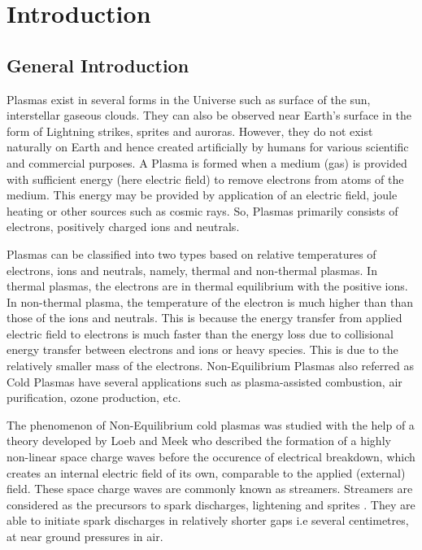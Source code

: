 \chapter{Introduction}
\section{General Introduction}
Plasmas exist in several forms in the Universe such as surface of the sun, interstellar gaseous clouds. They can also be observed near Earth's surface in the form of Lightning strikes, sprites and auroras. However, they do not exist naturally on Earth and hence created artificially by humans for various scientific and commercial purposes. A Plasma is formed when a medium (gas) is provided with sufficient energy (here electric field) to remove electrons from atoms of the medium. This energy may be provided by application of an electric field, joule heating or other sources such as cosmic rays. So, Plasmas primarily consists of electrons, positively charged ions and neutrals.

Plasmas can be classified into two types based on relative temperatures of electrons, ions and neutrals, namely, thermal and non-thermal plasmas. In thermal plasmas, the electrons are in thermal equilibrium with the positive ions. In non-thermal plasma, the temperature of the electron is much higher than than those of the ions and neutrals. This is because the energy transfer from applied electric field to electrons is much faster than the energy loss due to collisional energy transfer between electrons and ions or heavy species. This is due to the relatively smaller mass of the electrons. Non-Equilibrium Plasmas also referred as Cold Plasmas have several applications such as plasma-assisted combustion, air purification, ozone production, etc.

The phenomenon of Non-Equilibrium cold plasmas was studied with the help of a theory developed by Loeb and Meek \cite{Loeb and Meek , 1940a and 1940b} who described the formation of a highly non-linear space charge waves before the occurence of electrical breakdown, which creates an internal electric field of its own, comparable to the applied (external) field. These space charge waves are commonly known as streamers. Streamers are considered as the precursors to spark discharges, lightening\cite{Bazelyan et Raizer 2000} and sprites \cite{Franz et al 1990; Bourdon et al 2007}. They are able to initiate spark discharges in relatively shorter gaps i.e several centimetres, at near ground pressures in air.  

